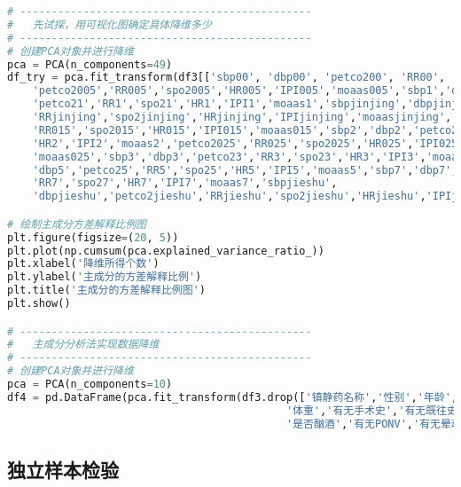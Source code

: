 \begin{lstlisting}[language=Python]
# ----------------------------------------------
#   先试探，用可视化图确定具体降维多少
# ----------------------------------------------
# 创建PCA对象并进行降维
pca = PCA(n_components=49)
df_try = pca.fit_transform(df3[['sbp00', 'dbp00', 'petco200', 'RR00', 'spo200', 'HR00', 'IPI00', 'moaas00',
    'petco2005','RR005','spo2005','HR005','IPI005','moaas005','sbp1','dbp1',
    'petco21','RR1','spo21','HR1','IPI1','moaas1','sbpjinjing','dbpjinjing','petco2jinjing',
    'RRjinjing','spo2jinjing','HRjinjing','IPIjinjing','moaasjinjing','petco2015',
    'RR015','spo2015','HR015','IPI015','moaas015','sbp2','dbp2','petco22','RR2','spo22',
    'HR2','IPI2','moaas2','petco2025','RR025','spo2025','HR025','IPI025',
    'moaas025','sbp3','dbp3','petco23','RR3','spo23','HR3','IPI3','moaas3','sbp5',
    'dbp5','petco25','RR5','spo25','HR5','IPI5','moaas5','sbp7','dbp7','petco27',
    'RR7','spo27','HR7','IPI7','moaas7','sbpjieshu',
    'dbpjieshu','petco2jieshu','RRjieshu','spo2jieshu','HRjieshu','IPIjieshu']])

# 绘制主成分方差解释比例图
plt.figure(figsize=(20, 5))
plt.plot(np.cumsum(pca.explained_variance_ratio_))
plt.xlabel('降维所得个数')
plt.ylabel('主成分的方差解释比例')
plt.title('主成分的方差解释比例图')
plt.show()

# ----------------------------------------------
#   主成分分析法实现数据降维
# ----------------------------------------------
# 创建PCA对象并进行降维
pca = PCA(n_components=10)
df4 = pd.DataFrame(pca.fit_transform(df3.drop(['镇静药名称','性别','年龄','身高',
                                            '体重','有无手术史','有无既往史','是否吸烟',
                                            '是否酗酒','有无PONV','有无晕动史'], axis=1)))
\end{lstlisting}


\subsection{独立样本检验}


